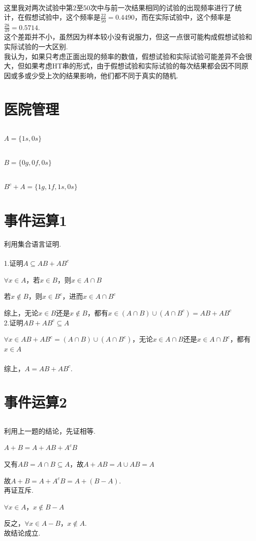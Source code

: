 \documentclass{article}
\begin{document}
\begin{CJK}{UTF8}{gbsn}
\\
这里我对两次试验中第2至50次中与前一次结果相同的试验的出现频率进行了统计，在假想试验中，这个频率是$ \frac{22}{50}=0.4490 $，而在实际试验中，这个频率是$ \frac{28}{49}=0.5714 $.
\\
这个差距并不小，虽然因为样本较小没有说服力，但这一点很可能构成假想试验和实际试验的一大区别.
\\
我认为，如果只考虑正面出现的频率的数值，假想试验和实际试验可能差异不会很大，但如果考虑HT串的形式，由于假想试验和实际试验的每次结果都会因不同原因或多或少受上次的结果影响，他们都不同于真实的随机.
\section{医院管理}
\subsection{}
$ A=\{1s,0s\} $
\subsection{}
$ B=\{0g,0f,0s\} $
\subsection{}
$ B^{c}+A=\{1g,1f,1s,0s\} $
\section{事件运算1}
利用集合语言证明.
\\\\
1.证明$ A\subseteq AB+AB^{c} $\par
$ \forall x\in A $，若$ x\in B$，则$ x\in A\cap B$\par
若$ x\notin B$，则$ x\in B^{c}$，进而$ x\in A\cap B^{c}$\par
综上，无论$x\in B$还是$x\notin B$，都有$x\in (A\cap B)\cup (A\cap B^{c})=AB+AB^{c}$\\
2.证明$ AB+AB^{c}\subseteq A $\par
$ \forall x\in AB+AB^{c}=(A\cap B)\cup(A\cap B^{c})$，无论$x\in A\cap B$还是$x\in A\cap B^{c}$，都有$x\in A$\\\\
综上，$A=AB+AB^{c}$.
\section{事件运算2}
\subsection{}
利用上一题的结论，先证相等.\par
$ A+B=A+AB+A^{c}B $\par
又有$ AB=A\cap B\subseteq A$，故$A+AB=A\cup AB=A$\par
故$ A+B=A+A^{c}B=A+(B-A)$.\\
再证互斥.\par
$\forall x\in A$，$x\notin B-A$\par
反之，$\forall x\in A-B$，$x\notin A$.\\
故结论成立.

\end{CJK}
\end{document}
